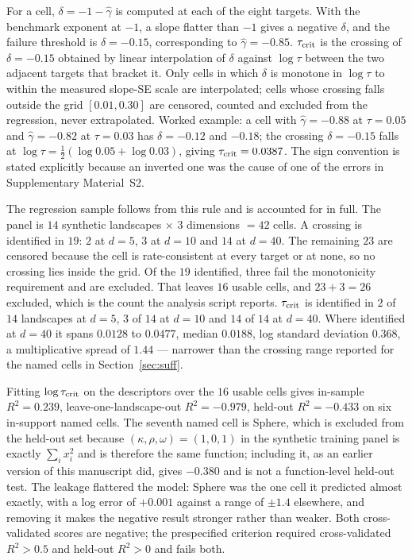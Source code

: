 \documentclass[pdflatex,sn-mathphys-num]{sn-jnl}
\theoremstyle{thmstyleone}
\theoremstyle{thmstyletwo}
\theoremstyle{thmstylethree}
\begin{document}
For a cell, $\delta=-1-\hat\gamma$ is computed at each of the eight targets. With the benchmark exponent at $-1$, a slope flatter than $-1$ gives a negative $\delta$, and the failure threshold is $\delta=-0.15$, corresponding to $\hat\gamma=-0.85$. $\tau_{\rm crit}$ is the crossing of $\delta=-0.15$ obtained by linear interpolation of $\delta$ against $\log\tau$ between the two adjacent targets that bracket it. Only cells in which $\delta$ is monotone in $\log\tau$ to within the measured slope-SE scale are interpolated; cells whose crossing falls outside the grid $[0.01,0.30]$ are censored, counted and excluded from the regression, never extrapolated. Worked example: a cell with $\hat\gamma=-0.88$ at $\tau=0.05$ and $\hat\gamma=-0.82$ at $\tau=0.03$ has $\delta=-0.12$ and $-0.18$; the crossing $\delta=-0.15$ falls at $\log\tau=\tfrac12(\log 0.05+\log 0.03)$, giving $\tau_{\rm crit}=0.0387$. The sign convention is stated explicitly because an inverted one was the cause of one of the errors in Supplementary Material~S2.

The regression sample follows from this rule and is accounted for in full. The panel is $14$ synthetic landscapes $\times$ $3$ dimensions $=42$ cells. A crossing is identified in $19$: $2$ at $d=5$, $3$ at $d=10$ and $14$ at $d=40$. The remaining $23$ are censored because the cell is rate-consistent at every target or at none, so no crossing lies inside the grid. Of the $19$ identified, three fail the monotonicity requirement and are excluded. That leaves $16$ usable cells, and $23+3=26$ excluded, which is the count the analysis script reports. $\tau_{\rm crit}$ is identified in $2$ of $14$ landscapes at $d=5$, $3$ of $14$ at $d=10$ and $14$ of $14$ at $d=40$. Where identified at $d=40$ it spans $0.0128$ to $0.0477$, median $0.0188$, log standard deviation $0.368$, a multiplicative spread of $1.44$ --- narrower than the crossing range reported for the named cells in Section~\ref{sec:suff}.

Fitting $\log\tau_{\rm crit}$ on the descriptors over the $16$ usable cells gives in-sample $R^2=0.239$, leave-one-landscape-out $R^2=-0.979$, held-out $R^2=-0.433$ on six in-support named cells. The seventh named cell is Sphere, which is excluded from the held-out set because $(\kappa,\rho,\omega)=(1,0,1)$ in the synthetic training panel is exactly $\sum_ix_i^2$ and is therefore the same function; including it, as an earlier version of this manuscript did, gives $-0.380$ and is not a function-level held-out test. The leakage flattered the model: Sphere was the one cell it predicted almost exactly, with a log error of $+0.001$ against a range of $\pm1.4$ elsewhere, and removing it makes the negative result stronger rather than weaker. Both cross-validated scores are negative; the prespecified criterion required cross-validated $R^2>0.5$ and held-out $R^2>0$ and fails both.
\end{document}
